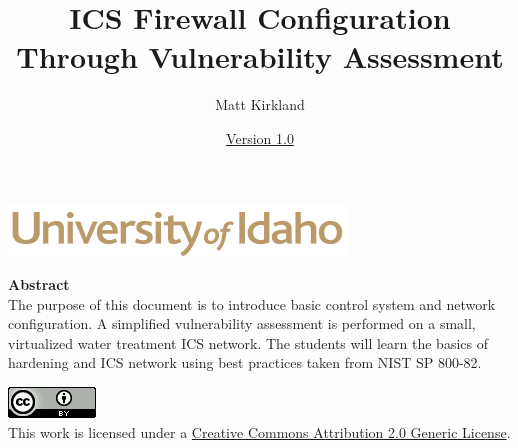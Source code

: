 \documentclass[12pt]{extarticle}
\begin{document}
\title{ICS Firewall Configuration Through Vulnerability Assessment}
\author{Matt Kirkland}
\date{\hyperref[changelog]{Version 1.0}} %
\renewcommand{\abstractname}{Summary}
\begin{titlepage}
\maketitle
{}
\begin{center}
\includegraphics[scale=.5]{figures/UofI}


\vskip 40pt

\textbf{Abstract}\\
The purpose of this document is to introduce basic control system and network configuration. A simplified vulnerability assessment is performed on a small, virtualized water treatment ICS network. The students will learn the basics of hardening and ICS network using best practices taken from NIST SP 800-82.
\end{center}


\vfill
\begin{center}
\includegraphics[scale=.5]{figures/cc}\\
This work is licensed under a \href{https://creativecommons.org/licenses/by/2.0/}{Creative Commons Attribution 2.0 Generic License}.
\vskip 10pt
\end{center}

\end{titlepage}


\pagebreak
\tableofcontents


\pagebreak
{}
\setcounter{section}{1}



\end{document}
